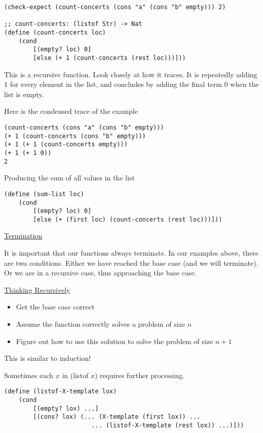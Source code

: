 \documentclass{article}
\begin{document}
\begin{lstlisting}
(check-expect (count-concerts (cons "a" (cons "b" empty))) 2)

;; count-concerts: (listof Str) -> Nat
(define (count-concerts loc)
    (cond
        [(empty? loc) 0]
        [else (+ 1 (count-concerts (rest loc)))]))
\end{lstlisting}

This is a recursive function. Look closely at how it traces. It is repeatedly adding 1 for every element in the list, and concludes by adding the final term 0 when the list is empty. 

Here is the condensed trace of the example

\begin{lstlisting}
(count-concerts (cons "a" (cons "b" empty)))
(+ 1 (count-concerts (cons "b" empty)))
(+ 1 (+ 1 (count-concerts empty)))
(+ 1 (+ 1 0))
2 
\end{lstlisting}

Producing the sum of all values in the list

\begin{lstlisting}
(define (sum-list loc)
    (cond
        [(empty? loc) 0]
        [else (+ (first loc) (count-concerts (rest loc)))]))
\end{lstlisting}

\underline{Termination}

It is important that our functions always terminate. In our examples above, there are two conditions. Either we have reached the base case (and we will terminate). Or we are in a recursive case, thus approaching the base case. 


\underline{Thinking Recursively}
\begin{itemize}
    \item Get the base case correct
    \item Assume the function correctly solves a problem of size $n$
    \item Figure out how to use this solution to solve the problem of size $n + 1$
\end{itemize}

This is similar to induction! 


Sometimes each $x$ in (listof $x$) requires further processing. 

\begin{lstlisting}
(define (listof-X-template lox)
    (cond 
        [(empty? lox) ...]
        [(cons? lox) (... (X-template (first lox)) ...
                        ... (listof-X-template (rest lox)) ...)]))
\end{lstlisting}
\end{document}
